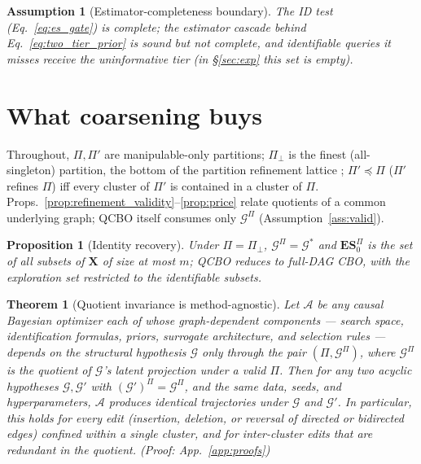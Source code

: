 \documentclass[twoside]{article}
\newtheorem{theorem}{Theorem}
\newtheorem{proposition}{Proposition}
\newtheorem{assumption}{Assumption}
\newcommand{\QCBO}{\textsc{QCBO}}
\newcommand{\CBO}{\textsc{CBO}}
\newcommand{\Gg}{\mathcal{G}}
\newcommand{\Gq}{\mathcal{G}^{\Pi}}
\newcommand{\ESpi}{\mathbf{ES}^{\Pi}}
\begin{document}
\begin{assumption}[Estimator-completeness boundary]
\label{ass:id_scheme}
The ID test (Eq.~\ref{eq:es_gate}) is complete; the estimator cascade behind Eq.~\eqref{eq:two_tier_prior} is sound but not complete, and identifiable queries it misses receive the uninformative tier (in \S\ref{sec:exp} this set is empty).
\end{assumption}

\section{What coarsening buys}
\label{sec:theory}
Throughout, $\Pi,\Pi'$ are manipulable-only partitions; $\Pi_\bot$ is the finest (all-singleton) partition, the bottom of the partition refinement lattice \citep{madaleno2026coarsening}; $\Pi'\preceq\Pi$ ($\Pi'$ refines $\Pi$) iff every cluster of $\Pi'$ is contained in a cluster of $\Pi$. Props.~\ref{prop:refinement_validity}--\ref{prop:price} relate quotients of a common underlying graph; \QCBO{} itself consumes only $\Gq$ (Assumption~\ref{ass:valid}).

\begin{proposition}[Identity recovery]
\label{prop:identity}
Under $\Pi=\Pi_\bot$, $\Gq=\Gg^{*}$ and $\ESpi_0$ is the set of all subsets of $\mathbf{X}$ of size at most $m$; \QCBO{} reduces to full-DAG \CBO{}, with the exploration set restricted to the identifiable subsets.
\end{proposition}

\begin{theorem}[Quotient invariance is method-agnostic]
\label{thm:contract}
Let $\mathcal{A}$ be any causal Bayesian optimizer each of whose graph-dependent components --- search space, identification formulas, priors, surrogate architecture, and selection rules --- depends on the structural hypothesis $\Gg$ only through the pair $(\Pi, \Gq)$, where $\Gq$ is the quotient of $\Gg$'s latent projection under a valid $\Pi$. Then for any two acyclic hypotheses $\Gg,\Gg'$ with $(\Gg')^{\Pi}=\Gq$, and the same data, seeds, and hyperparameters, $\mathcal{A}$ produces identical trajectories under $\Gg$ and $\Gg'$. In particular, this holds for every edit (insertion, deletion, or reversal of directed or bidirected edges) confined within a single cluster, and for inter-cluster edits that are redundant in the quotient. (Proof: App.~\ref{app:proofs})
\end{theorem}
\end{document}
